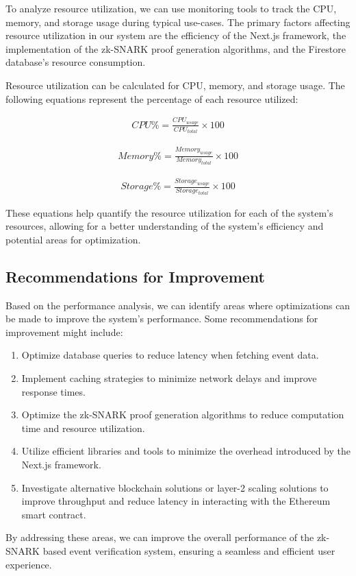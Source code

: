 To analyze resource utilization, we can use monitoring tools to track the CPU, memory, and storage usage during typical use-cases. The primary factors affecting resource utilization in our system are the efficiency of the Next.js framework, the implementation of the zk-SNARK proof generation algorithms, and the Firestore database's resource consumption.

Resource utilization can be calculated for CPU, memory, and storage usage. The following equations represent the percentage of each resource utilized:

\begin{align}
CPU\% = \frac{CPU_{usage}}{CPU_{total}} \times 100\label{EqCPU}
\end{align}

\begin{align}
Memory\% = \frac{Memory_{usage}}{Memory_{total}} \times 100\label{EqMemory}
\end{align}

\begin{align}
Storage\% = \frac{Storage_{usage}}{Storage_{total}} \times 100\label{EqStorage}
\end{align}

These equations help quantify the resource utilization for each of the system's resources, allowing for a better understanding of the system's efficiency and potential areas for optimization.

\subsection{Recommendations for Improvement}
Based on the performance analysis, we can identify areas where optimizations can be made to improve the system's performance. Some recommendations for improvement might include:

\begin{enumerate}
    \item Optimize database queries to reduce latency when fetching event data.
    \item Implement caching strategies to minimize network delays and improve response times.
    \item Optimize the zk-SNARK proof generation algorithms to reduce computation time and resource utilization.
    \item Utilize efficient libraries and tools to minimize the overhead introduced by the Next.js framework.
    \item Investigate alternative blockchain solutions or layer-2 scaling solutions to improve throughput and reduce latency in interacting with the Ethereum smart contract.
\end{enumerate}

By addressing these areas, we can improve the overall performance of the zk-SNARK based event verification system, ensuring a seamless and efficient user experience.

